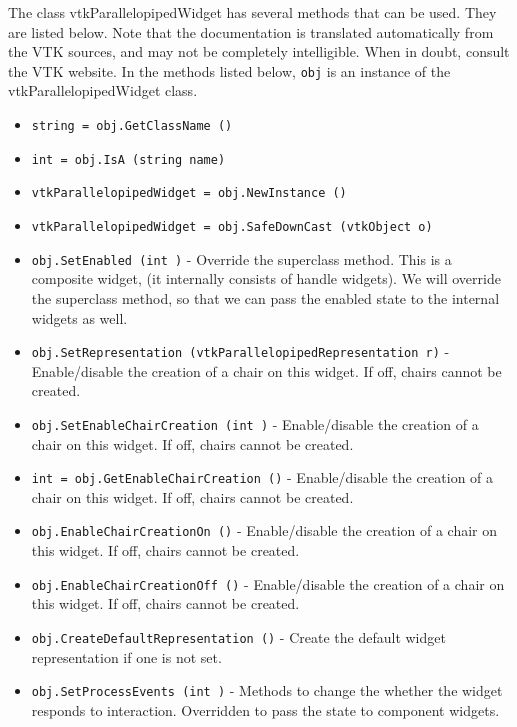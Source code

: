 The class vtkParallelopipedWidget has several methods that can be used.
  They are listed below.
Note that the documentation is translated automatically from the VTK sources,
and may not be completely intelligible.  When in doubt, consult the VTK website.
In the methods listed below, \verb|obj| is an instance of the vtkParallelopipedWidget class.
\begin{itemize}
\item  \verb|string = obj.GetClassName ()|

\item  \verb|int = obj.IsA (string name)|

\item  \verb|vtkParallelopipedWidget = obj.NewInstance ()|

\item  \verb|vtkParallelopipedWidget = obj.SafeDownCast (vtkObject o)|

\item  \verb|obj.SetEnabled (int )| -  Override the superclass method. This is a composite widget, (it internally
 consists of handle widgets). We will override the superclass method, so
 that we can pass the enabled state to the internal widgets as well.

\item  \verb|obj.SetRepresentation (vtkParallelopipedRepresentation r)| -  Enable/disable the creation of a chair on this widget. If off,
 chairs cannot be created.

\item  \verb|obj.SetEnableChairCreation (int )| -  Enable/disable the creation of a chair on this widget. If off,
 chairs cannot be created.

\item  \verb|int = obj.GetEnableChairCreation ()| -  Enable/disable the creation of a chair on this widget. If off,
 chairs cannot be created.

\item  \verb|obj.EnableChairCreationOn ()| -  Enable/disable the creation of a chair on this widget. If off,
 chairs cannot be created.

\item  \verb|obj.EnableChairCreationOff ()| -  Enable/disable the creation of a chair on this widget. If off,
 chairs cannot be created.

\item  \verb|obj.CreateDefaultRepresentation ()| -  Create the default widget representation if one is not set. 

\item  \verb|obj.SetProcessEvents (int )| -  Methods to change the whether the widget responds to interaction.
 Overridden to pass the state to component widgets.

\end{itemize}
